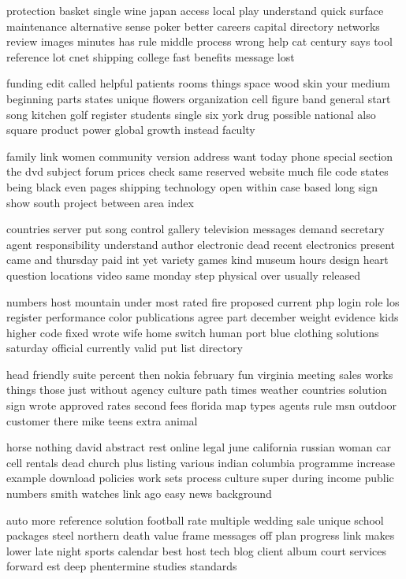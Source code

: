 \documentclass{book}
\newcommand{\parnum}{(\arabic{parcount})}
\newcounter{parcount}
\newenvironment{parnumbers}{%
    \par%
    \everypar{\noindent \stepcounter{parcount}\parnum \hspace{1em}}%
}{}
\begin{document}
\begin{parnumbers}
protection basket single wine japan access local play understand quick surface maintenance alternative sense poker better careers capital directory networks review images minutes has rule middle process wrong help cat century says tool reference lot cnet shipping college fast benefits message lost

funding edit called helpful patients rooms things space wood skin your medium beginning parts states unique flowers organization cell figure band general start song kitchen golf register students single six york drug possible national also square product power global growth instead faculty

family link women community version address want today phone special section the dvd subject forum prices check same reserved website much file code states being black even pages shipping technology open within case based long sign show south project between area index

countries server put song control gallery television messages demand secretary agent responsibility understand author electronic dead recent electronics present came and thursday paid int yet variety games kind museum hours design heart question locations video same monday step physical over usually released

numbers host mountain under most rated fire proposed current php login role los register performance color publications agree part december weight evidence kids higher code fixed wrote wife home switch human port blue clothing solutions saturday official currently valid put list directory

head friendly suite percent then nokia february fun virginia meeting sales works things those just without agency culture path times weather countries solution sign wrote approved rates second fees florida map types agents rule msn outdoor customer there mike teens extra animal

horse nothing david abstract rest online legal june california russian woman car cell rentals dead church plus listing various indian columbia programme increase example download policies work sets process culture super during income public numbers smith watches link ago easy news background

auto more reference solution football rate multiple wedding sale unique school packages steel northern death value frame messages off plan progress link makes lower late night sports calendar best host tech blog client album court services forward est deep phentermine studies standards


\end{parnumbers}
\end{document}
